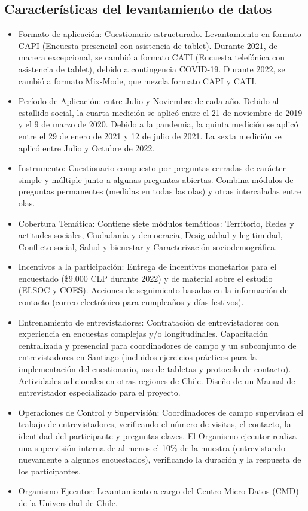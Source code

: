 \documentclass[
  12pt,
]{book}
\providecommand{\tightlist}{%
  \setlength{\itemsep}{0pt}\setlength{\parskip}{0pt}}
\begin{document}
\hypertarget{caracteruxedsticas-del-levantamiento-de-datos}{%
\subsection*{Características del levantamiento de datos}\label{caracteruxedsticas-del-levantamiento-de-datos}}

\begin{itemize}
\tightlist
\item
  Formato de aplicación: Cuestionario estructurado. Levantamiento en formato CAPI (Encuesta presencial con asistencia de tablet). Durante 2021, de manera excepcional, se cambió a formato CATI (Encuesta telefónica con asistencia de tablet), debido a contingencia COVID-19. Durante 2022, se cambió a formato Mix-Mode, que mezcla formato CAPI y CATI.
\item
  Período de Aplicación: entre Julio y Noviembre de cada año. Debido al estallido social, la cuarta medición se aplicó entre el 21 de noviembre de 2019 y el 9 de marzo de 2020. Debido a la pandemia, la quinta medición se aplicó entre el 29 de enero de 2021 y 12 de julio de 2021. La sexta medición se aplicó entre Julio y Octubre de 2022.
\item
  Instrumento: Cuestionario compuesto por preguntas cerradas de carácter simple y múltiple junto a algunas preguntas abiertas. Combina módulos de preguntas permanentes (medidas en todas las olas) y otras intercaladas entre olas.
\item
  Cobertura Temática: Contiene siete módulos temáticos: Territorio, Redes y actitudes sociales, Ciudadanía y democracia, Desigualdad y legitimidad, Conflicto social, Salud y bienestar y Caracterización sociodemográfica.
\item
  Incentivos a la participación: Entrega de incentivos monetarios para el encuestado (\$9.000 CLP durante 2022) y de material sobre el estudio (ELSOC y COES). Acciones de seguimiento basadas en la información de contacto (correo electrónico para cumpleaños y días festivos).
\item
  Entrenamiento de entrevistadores: Contratación de entrevistadores con experiencia en encuestas complejas y/o longitudinales. Capacitación centralizada y presencial para coordinadores de campo y un subconjunto de entrevistadores en Santiago (incluidos ejercicios prácticos para la implementación del cuestionario, uso de tabletas y protocolo de contacto). Actividades adicionales en otras regiones de Chile. Diseño de un Manual de entrevistador especializado para el proyecto.
\item
  Operaciones de Control y Supervisión: Coordinadores de campo supervisan el trabajo de entrevistadores, verificando el número de visitas, el contacto, la identidad del participante y preguntas claves. El Organismo ejecutor realiza una supervisión interna de al menos el 10\% de la muestra (entrevistando nuevamente a algunos encuestados), verificando la duración y la respuesta de los participantes.
\item
  Organismo Ejecutor: Levantamiento a cargo del Centro Micro Datos (CMD) de la Universidad de Chile.
\end{itemize}
\end{document}
